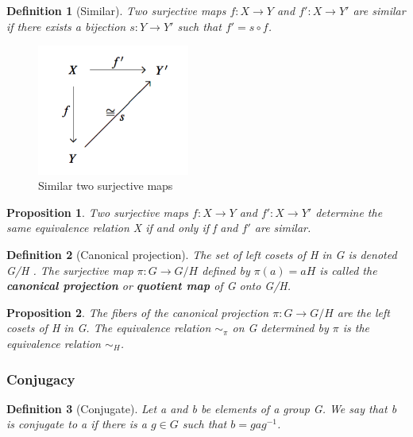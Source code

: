 \documentclass[12pt]{article}
\newtheorem{definition}{Definition}[subsection]
\newtheorem{proposition}{Proposition}[subsection]
\begin{document}
    \begin{definition}[Similar]
        Two surjective maps $f: X \rightarrow Y$ and $f': X \rightarrow Y'$ are similar if there exists a bijection $s: Y \rightarrow Y'$ such that $f' = s \circ f$.
    \end{definition}
    \begin{figure}[H]
        \begin{center}
        \includegraphics[width=5cm]{./Img/similar.png}
        \caption{Similar two surjective maps}
        \end{center}
    \end{figure}
    \begin{proposition}
        Two surjective maps $f: X \rightarrow Y$ and $f': X \rightarrow Y'$ determine the same equivalence relation X if and only if f and $f'$ are similar.
    \end{proposition}
    \begin{definition}[Canonical projection]
        The set of left cosets of H in G is denoted G/H . The surjective map $\pi : G \rightarrow G/H$ defined by $\pi(a) = aH$ is called the \textbf{canonical projection} or \textbf{quotient map} of G onto G/H.
    \end{definition}

    \begin{proposition}
    The fibers of the canonical projection $\pi : G \rightarrow G/H$ are the left cosets of H in G. The equivalence relation $\sim_{\pi}$ on G determined by $\pi$ is the equivalence relation $\sim_H$.
    \end{proposition}
    \subsubsection{Conjugacy}
        \begin{definition}[Conjugate]
            Let a and b be elements of a group G. We say that b is conjugate to a if there is a $g \in G$ such that $b = gag^{-1}$.
        \end{definition}
        
\end{document}
